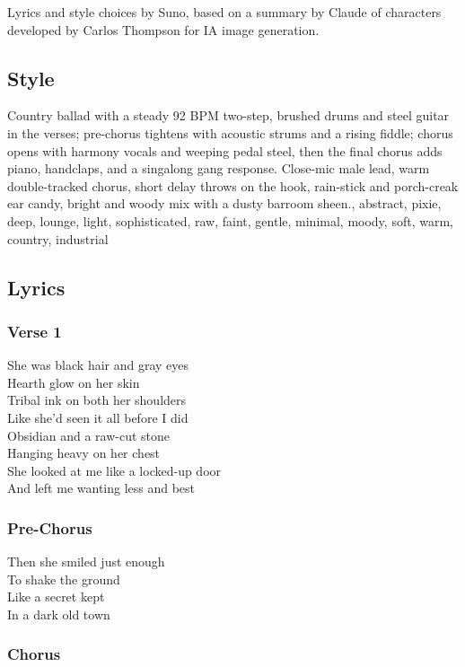 Lyrics and style choices by Suno, based on a summary by Claude of
characters developed by Carlos Thompson for IA image generation.

\subsection{Style}\label{style-5}

Country ballad with a steady 92 BPM two-step, brushed drums and steel
guitar in the verses; pre-chorus tightens with acoustic strums and a
rising fiddle; chorus opens with harmony vocals and weeping pedal steel,
then the final chorus adds piano, handclaps, and a singalong gang
response. Close-mic male lead, warm double-tracked chorus, short delay
throws on the hook, rain-stick and porch-creak ear candy, bright and
woody mix with a dusty barroom sheen., abstract, pixie, deep, lounge,
light, sophisticated, raw, faint, gentle, minimal, moody, soft, warm,
country, industrial

\subsection{Lyrics}\label{lyrics-5}

\subsubsection{Verse 1}\label{verse-1-2}

She was black hair and gray eyes\\
Hearth glow on her skin\\
Tribal ink on both her shoulders\\
Like she'd seen it all before I did\\
Obsidian and a raw-cut stone\\
Hanging heavy on her chest\\
She looked at me like a locked-up door\\
And left me wanting less and best

\subsubsection{Pre-Chorus}\label{pre-chorus}

Then she smiled just enough\\
To shake the ground\\
Like a secret kept\\
In a dark old town

\subsubsection{Chorus}\label{chorus-7}

